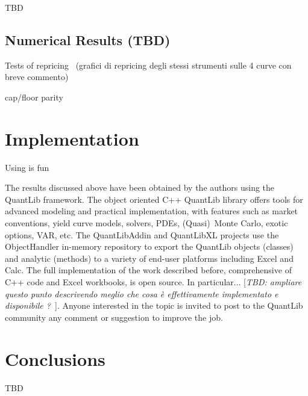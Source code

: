 \documentclass[11pt,reqno]{amsart}
\begin{document}
TBD

\subsection{Numerical Results (TBD)}

Tests of repricing \ (grafici di repricing degli stessi strumenti sulle 4
curve con breve commento)

cap/floor parity

\section{Implementation}
Using \cite{ql090} is fun

The results discussed above have been obtained by the authors using the QuantLib framework. The object oriented C++ QuantLib library \cite{QuantLib} offers tools for advanced modeling and practical implementation, with features such as market conventions, yield curve models, solvers, PDEs, (Quasi)\ Monte Carlo, exotic options, VAR, etc. The QuantLibAddin \cite{QuantLibAddin} and QuantLibXL \cite{QuantLibXL} projects use the ObjectHandler in-memory repository \cite{ObjectHandler} to export the QuantLib objects (classes) and analytic (methods) to a variety of end-user platforms including Excel and Calc. The full implementation of the work described before, comprehensive of C++ code and Excel workbooks, is open source. In particular...
[\textit{TBD: ampliare questo punto descrivendo meglio che cosa \`{e} effettivamente implementato e disponibile ?\ }]. Anyone interested in the topic is invited to post to the QuantLib community any comment or suggestion to improve the job.

\section{\textbf{Conclusions}}

TBD




\end{document}
